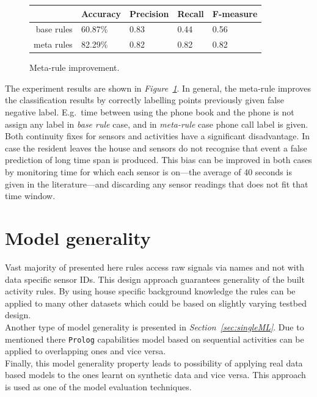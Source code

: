\documentclass[10pt, a4paper, pdflatex, leqno, twoside, openright]{report}
\begin{document}
\begin{figure}[htb]
  \centering
  \begin{tabular}{ r | l l l l }
 & Accuracy & Precision & Recall & F-measure\\
\hline
base rules & 60.87\% & 0.83 & 0.44 & 0.56\\
meta rules & 82.29\% & 0.82 & 0.82 & 0.82 \\
  \end{tabular}
  \caption{Meta-rule improvement.\label{tab:metaImprovement}}
\end{figure}

The experiment results are shown in \emph{Figure~\ref{tab:metaImprovement}}. In general, the meta-rule improves the classification results by correctly labelling points previously given false negative label. E.g.\ time between using the phone book and the phone is not assign any label in \emph{base rule} case, and in \emph{meta-rule} case phone call label is given.\\

Both continuity fixes for sensors and activities have a significant disadvantage. In case the resident leaves the house and sensors do not recognise that event a false prediction of long time span is produced. This bias can be improved in both cases by monitoring time for which each sensor is on---the average of 40 seconds is given in the literature---and discarding any sensor readings that does not fit that time window.

  \section{Model generality}
Vast majority of presented here rules access raw signals via names and not with data specific sensor IDs. This design approach guarantees generality of the built activity rules. By using house specific background knowledge the rules can be applied to many other datasets which could be based on slightly varying testbed design.\\
Another type of model generality is presented in \emph{Section~\ref{sec:singleML}}. Due to mentioned there \texttt{Prolog} capabilities model based on sequential activities can be applied to overlapping ones and vice versa.\\

Finally, this model generality property leads to possibility of applying real data based models to the ones learnt on synthetic data and vice versa. This approach is used as one of the model evaluation techniques.
\end{document}
